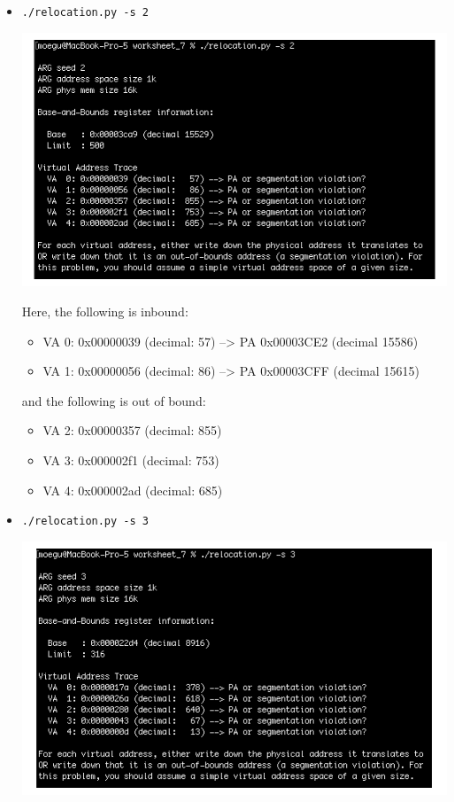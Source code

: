 \documentclass[12pt]{article}
\begin{document}
\begin{enumerate}[1.]
\begin{itemize}
        \item \texttt{./relocation.py -s 2}

        \begin{center}
        \includegraphics[width=0.8\linewidth]{images/worksheet_7_solution_2.png}
        \end{center}

        \bigskip

        Here, the following is inbound:

        \begin{itemize}
            \item VA  0: 0x00000039 (decimal:   57) --> PA 0x00003CE2 (decimal 15586)
            \item VA  1: 0x00000056 (decimal:   86) --> PA 0x00003CFF (decimal 15615)
        \end{itemize}

        \bigskip

        and the following is out of bound:

        \begin{itemize}
            \item VA  2: 0x00000357 (decimal:  855)
            \item VA  3: 0x000002f1 (decimal:  753)
            \item VA  4: 0x000002ad (decimal:  685)
        \end{itemize}


        \item \texttt{./relocation.py -s 3}

        \begin{center}
        \includegraphics[width=0.8\linewidth]{images/worksheet_7_solution_3.png}
        \end{center}


\end{itemize}
\end{enumerate}
\end{document}
